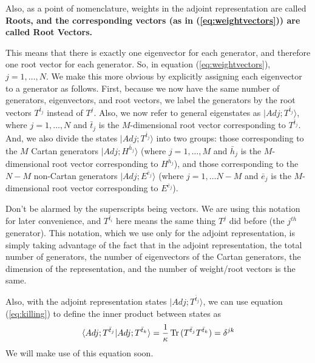 \documentclass[12pt,epsf]{article}
\def\Tr{\mathop{\rm Tr \,} \nolimits}
\begin{document}
Also, as a point of nomenclature, weights in the adjoint representation
are called \bf Roots\rm, and the corresponding vectors (as in
(\ref{eq:weightvectors})) are called \bf Root Vectors\rm.  

This means that there is exactly one eigenvector for each generator,
and therefore one root vector for each generator.  So, in equation
(\ref{eq:weightvectors}), $j=1,\ldots,N$.  We make this more obvious by
explicitly assigning each eigenvector to a generator as follows. 
First, because we now have the same number of generators, eigenvectors,
and root vectors, we label the generators by the root vectors $T^{\bar
t_j}$ instead of $T^j$.  Also, we now refer to general eigenstates as
$|Adj;T^{\bar t_j}\rangle$, where $j=1,\ldots,N$ and $\bar t_j$ is the
$M$-dimensional root vector corresponding to $T^{\bar t_j}$.  And, we
also divide the states $|Adj;T^{\bar t_j}\rangle$ into two groups:
those corresponding to the $M$ Cartan generators $|Adj;H^{\bar
h_j}\rangle$ (where $j=1,\ldots,M$ and $\bar h_j$ is the $M$-dimensional
root vector corresponding to $H^{\bar h_j}$), and those
corresponding to the $N-M$ non-Cartan generators $|Adj;E^{\bar
e_j}\rangle$ (where $j=1,\ldots N-M$ and $\bar e_j$ is the $M$-dimensional
root vector corresponding to $E^{\bar e_j}$).  

Don't be alarmed by the superscripts being vectors.  We are using this
notation for later convenience, and $T^{\bar t_i}$ here means the same
thing $T^j$ did before (the $j^{th}$ generator).  This notation, which
we use only for the adjoint representation, is simply taking advantage
of the fact that in the adjoint representation, the total number of
generators, the number of eigenvectors of the Cartan generators, the
dimension of the representation, and the number of weight/root vectors
is the same.  

Also, with the adjoint representation states $|Adj;T^{\bar
t_j}\rangle$, we can use equation (\ref{eq:killing}) to define the
inner product between states as 
\begin{eqnarray}
\langle Adj; T^{\bar t_j}|Adj;T^{\bar t_k}\rangle = {1\over
\kappa}\Tr(T^{\bar t_j}T^{\bar t_k}) = \delta^{jk} \label{eq:modkilling}
\end{eqnarray}
We will make use of this equation soon.  
\end{document}
